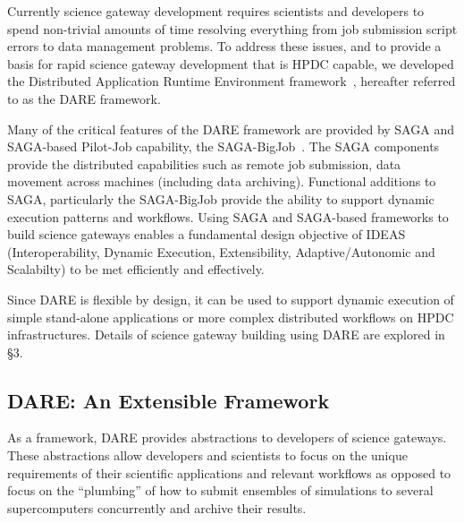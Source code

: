 \documentclass[]{svjour3}
\begin{document}
  Currently science gateway development requires scientists and
  developers to spend non-trivial amounts of time resolving everything
  from job submission script errors to data management problems. To
  address these issues, and to provide a basis for rapid science
  gateway development that is HPDC capable, we developed the
  Distributed Application Runtime Environment
  framework~\cite{dareurl}, hereafter referred to as the DARE
  framework.
  
  Many of the critical features of the DARE framework are provided by
  SAGA and SAGA-based Pilot-Job capability, the
  SAGA-BigJob~\cite{saga_bigjob_condor_cloud}.  The SAGA components
  provide the distributed capabilities such as remote job submission,
  data movement across machines (including data archiving).
  Functional additions to SAGA, particularly the SAGA-BigJob provide
  the ability to support dynamic execution patterns and
  workflows. Using SAGA and SAGA-based frameworks to build science
  gateways enables a fundamental design objective of
  IDEAS~\cite{ideas} (Interoperability, Dynamic Execution,
  Extensibility, Adaptive/Autonomic and Scalabilty) to be met
  efficiently and
  effectively.  %
 
  Since DARE is flexible by design, it can be used to support dynamic
  execution of simple stand-alone applications or more complex distributed
  workflows on HPDC infrastructures. Details of science gateway building
  using DARE are explored in \S3.


\subsection{DARE: An Extensible Framework}


As a framework, DARE provides abstractions to developers of science
gateways. These abstractions allow developers and scientists to focus
on the unique requirements of their scientific applications and
relevant workflows as opposed to focus on the ``plumbing'' of how to
submit ensembles of simulations to several supercomputers concurrently
and archive their results.
\end{document}
